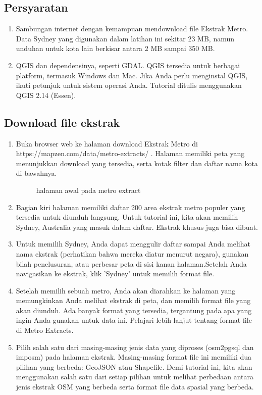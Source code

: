 \subsection{Persyaratan}
\begin{enumerate}
\item 
Sambungan internet dengan kemampuan mendownload file Ekstrak Metro. Data Sydney yang digunakan dalam latihan ini sekitar 23 MB, namun unduhan untuk kota lain berkisar antara 2 MB sampai 350 MB.
\item
QGIS dan dependensinya, seperti GDAL. QGIS tersedia untuk berbagai platform, termasuk Windows dan Mac. Jika Anda perlu menginstal QGIS, ikuti petunjuk untuk sistem operasi Anda. Tutorial ditulis menggunakan QGIS 2.14 (Essen).
\end{enumerate}
\subsection {Download file ekstrak}
\begin{enumerate}
\item
Buka browser web ke halaman download Ekstrak Metro di https://mapzen.com/data/metro-extracts/ . Halaman memiliki peta yang menunjukkan download yang tersedia, serta kotak filter dan daftar nama kota di bawahnya.

\begin{figure}[ht]
\caption{halaman awal pada metro extract}
\label {halamanawal}
\end{figure}

\item 
Bagian kiri halaman memiliki daftar 200 area ekstrak metro populer yang tersedia untuk diunduh langsung. Untuk tutorial ini, kita akan memilih Sydney, Australia yang masuk dalam daftar. Ekstrak khusus juga bisa dibuat.
\item
Untuk memilih Sydney, Anda dapat menggulir daftar sampai Anda melihat nama ekstrak (perhatikan bahwa mereka diatur menurut negara), gunakan bilah penelusuran, atau perbesar peta di sisi kanan halaman.Setelah Anda navigasikan ke ekstrak, klik 'Sydney' untuk memilih format file.
\item
Setelah memilih sebuah metro, Anda akan diarahkan ke halaman yang memungkinkan Anda melihat ekstrak di peta, dan memilih format file yang akan diunduh. Ada banyak format yang tersedia, tergantung pada apa yang ingin Anda gunakan untuk data ini. Pelajari lebih lanjut tentang format file di Metro Extracts.
 
\item
Pilih salah satu dari masing-masing jenis data yang diproses (osm2pgsql dan imposm) pada halaman ekstrak. Masing-masing format file ini memiliki dua pilihan yang berbeda: GeoJSON atau Shapefile. Demi tutorial ini, kita akan menggunakan salah satu dari setiap pilihan untuk melihat perbedaan antara jenis ekstrak OSM yang berbeda serta format file data spasial yang berbeda.

\end{enumerate}

